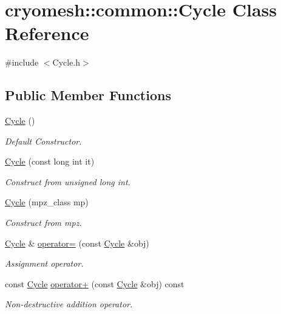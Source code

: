 \hypertarget{classcryomesh_1_1common_1_1Cycle}{\section{cryomesh\-:\-:common\-:\-:\-Cycle \-Class \-Reference}
\label{classcryomesh_1_1common_1_1Cycle}
}


{\ttfamily \#include $<$\-Cycle.\-h$>$}

\subsection*{\-Public \-Member \-Functions}
\begin{DoxyCompactItemize}
\item 
\hyperlink{classcryomesh_1_1common_1_1Cycle_a3ec7b4684fc43ded87c53f497124d384}{\-Cycle} ()
\begin{DoxyCompactList}\small\item\em \-Default \-Constructor. \end{DoxyCompactList}\item 
\hyperlink{classcryomesh_1_1common_1_1Cycle_af3feb1bcc151a49815a13950c2c2e786}{\-Cycle} (const long int it)
\begin{DoxyCompactList}\small\item\em \-Construct from unsigned long int. \end{DoxyCompactList}\item 
\hyperlink{classcryomesh_1_1common_1_1Cycle_a9187de66119f4f3f7e035ff9f961e60f}{\-Cycle} (mpz\-\_\-class mp)
\begin{DoxyCompactList}\small\item\em \-Construct from mpz. \end{DoxyCompactList}\item 
\hyperlink{classcryomesh_1_1common_1_1Cycle}{\-Cycle} \& \hyperlink{classcryomesh_1_1common_1_1Cycle_a5061bb5d219d7a0cc841e1ee7306942e}{operator=} (const \hyperlink{classcryomesh_1_1common_1_1Cycle}{\-Cycle} \&obj)
\begin{DoxyCompactList}\small\item\em \-Assignment operator. \end{DoxyCompactList}\item 
const \hyperlink{classcryomesh_1_1common_1_1Cycle}{\-Cycle} \hyperlink{classcryomesh_1_1common_1_1Cycle_abfb487638d7cbcb6dc7cc9b69c5bfbbc}{operator+} (const \hyperlink{classcryomesh_1_1common_1_1Cycle}{\-Cycle} \&obj) const 
\begin{DoxyCompactList}\small\item\em \-Non-\/destructive addition operator. \end{DoxyCompactList}\item 

\end{DoxyCompactItemize}
